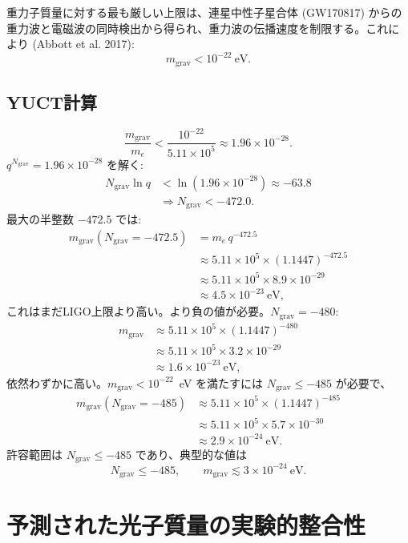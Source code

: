 \documentclass[11pt,a4paper]{article}
\begin{document}
	重力子質量に対する最も厳しい上限は、連星中性子星合体 (GW170817) からの重力波と電磁波の同時検出から得られ、重力波の伝播速度を制限する。これにより (Abbott et al. 2017):
	\[
	m_{\mathrm{grav}} < 10^{-22}~\mathrm{eV}.
	\]
	
	\subsection{YUCT計算}
	
	\[
	\frac{m_{\mathrm{grav}}}{m_e} < \frac{10^{-22}}{5.11\times10^5} \approx 1.96\times 10^{-28}.
	\]
	$q^{N_{\mathrm{grav}}} = 1.96\times10^{-28}$ を解く:
	\[
	\begin{aligned}
		N_{\mathrm{grav}} \ln q &< \ln(1.96\times10^{-28}) \approx -63.8 \\
		&\Longrightarrow N_{\mathrm{grav}} < -472.0 .
	\end{aligned}
	\]
	最大の半整数 $-472.5$ では:
	\[
	\begin{aligned}
		m_{\mathrm{grav}}(N_{\mathrm{grav}} = -472.5) &= m_e \, q^{-472.5} \\
		&\approx 5.11\times10^5 \times (1.1447)^{-472.5} \\
		&\approx 5.11\times10^5 \times 8.9\times10^{-29} \\
		&\approx 4.5 \times 10^{-23}~\mathrm{eV},
	\end{aligned}
	\]
	これはまだLIGO上限より高い。より負の値が必要。$N_{\mathrm{grav}} = -480$:
	\[
	\begin{aligned}
		m_{\mathrm{grav}} &\approx 5.11\times10^5 \times (1.1447)^{-480} \\
		&\approx 5.11\times10^5 \times 3.2\times10^{-29} \\
		&\approx 1.6 \times 10^{-23}~\mathrm{eV},
	\end{aligned}
	\]
	依然わずかに高い。$m_{\mathrm{grav}} < 10^{-22}$~eV を満たすには $N_{\mathrm{grav}} \le -485$ が必要で、
	\[
	\begin{aligned}
		m_{\mathrm{grav}}(N_{\mathrm{grav}} = -485) &\approx 5.11\times10^5 \times (1.1447)^{-485} \\
		&\approx 5.11\times10^5 \times 5.7\times10^{-30} \\
		&\approx 2.9 \times 10^{-24}~\mathrm{eV}.
	\end{aligned}
	\]
	許容範囲は $N_{\mathrm{grav}} \le -485$ であり、典型的な値は
	\[
	\boxed{N_{\mathrm{grav}} \le -485}, \qquad
	\boxed{m_{\mathrm{grav}} \lesssim 3 \times 10^{-24}~\mathrm{eV}} .
	\]
	
	\clearpage
	\section{予測された光子質量の実験的整合性}
	\label{sec:photon_consistency}
	
\end{document}
